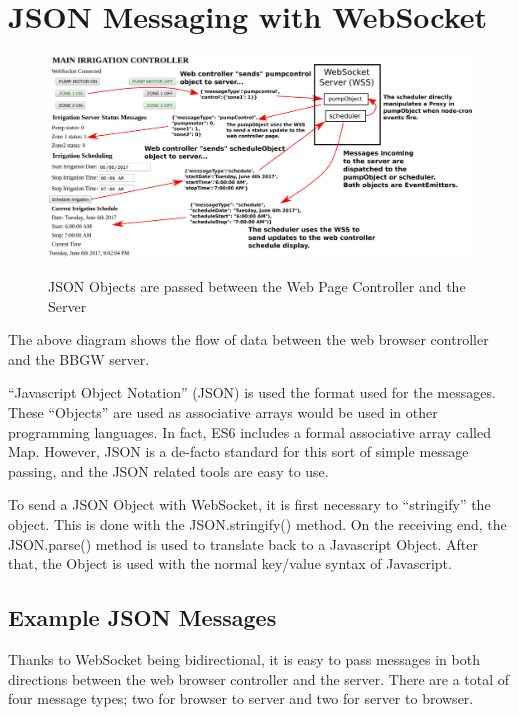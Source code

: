 \chapter{JSON Messaging with WebSocket}

\begin{figure}[h]
	\centering
    \includegraphics[width=1.0\textwidth]{diagrams/websocket_comms}
	\centering\bfseries
	\caption{JSON Objects are passed between the Web Page Controller and the 
	Server}
\end{figure}

The above diagram shows the flow of data between the web browser controller and 
the BBGW server.

``Javascript Object Notation'' (JSON) is used the format used for the 
messages.  These ``Objects'' are used as associative arrays would be 
used in other programming languages.  In fact, ES6 includes a formal 
associative array called Map.  However, JSON is a de-facto standard for this 
sort of simple message passing, and the JSON related tools are easy to use.

To send a JSON Object with WebSocket, it is first necessary to ``stringify'' 
the object.  This is done with the JSON.stringify() method.  On the receiving 
end, the JSON.parse() method is used to translate back to a Javascript Object.  
After that, the Object is used with the normal key/value syntax of Javascript.

\section{Example JSON Messages}

Thanks to WebSocket being bidirectional, it is easy to pass messages in both 
directions between the web browser controller and the server.  There are a 
total of four message types; two for browser to server and two for server to 
browser.

